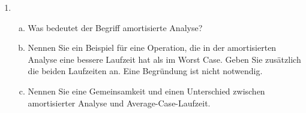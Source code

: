\documentclass{scrartcl}
\begin{document}
\begin{enumerate}[(1)]
\item \begin{enumerate}[(a)]
\item Was bedeutet der Begriff \glqq amortisierte Analyse\grqq?
\item Nennen Sie ein Beispiel für eine Operation, die in der amortisierten Analyse eine bessere Laufzeit hat als im Worst Case. Geben Sie zusätzlich die beiden Laufzeiten an. Eine Begründung ist nicht notwendig.
\item Nennen Sie eine Gemeinsamkeit und einen Unterschied zwischen amortisierter Analyse und Average-Case-Laufzeit.
\end{enumerate}
\end{enumerate}
\end{document}
